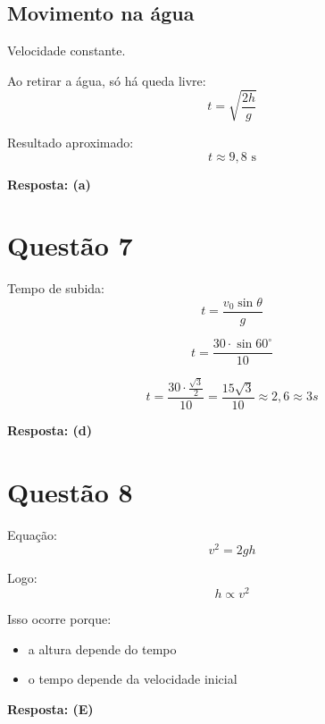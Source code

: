 \documentclass[a4paper,12pt]{article}
\newcommand{\printingbibliography}{%

    \pagestyle{myheadings}
    \markright{}
    \sloppy
    \printbibliography[heading=bibintoc, %
                   title=Refer\^encias %
                  ]
    \fussy%
}
\begin{document}
\subsection*{Movimento na água}
Velocidade constante.

Ao retirar a água, só há queda livre:
\begin{equation}
t = \sqrt{\frac{2h}{g}}
\end{equation}

Resultado aproximado:
\begin{equation}
t \approx 9{,}8 \text{ s}
\end{equation}

\textbf{Resposta: (a)}

\newpage

\section*{Questão 7}

Tempo de subida:
\begin{equation}
t = \frac{v_0 \sin\theta}{g}
\end{equation}

\begin{equation}
t = \frac{30 \cdot \sin 60^\circ}{10}
\end{equation}

\begin{equation}
t = \frac{30 \cdot \frac{\sqrt{3}}{2}}{10}
= \frac{15\sqrt{3}}{10}
\approx 2{,}6 \approx 3s
\end{equation}

\textbf{Resposta: (d)}

\newpage

\section*{Questão 8}

Equação:
\begin{equation}
v^2 = 2gh
\end{equation}

Logo:
\begin{equation}
h \propto v^2
\end{equation}

Isso ocorre porque:
\begin{itemize}
\item a altura depende do tempo
\item o tempo depende da velocidade inicial
\end{itemize}

\textbf{Resposta: (E)}

\printingbibliography
\end{document}
